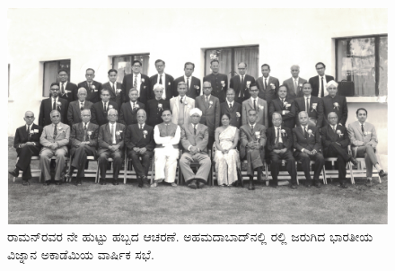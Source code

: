 \begin{figure}
\centering
\includegraphics[scale=0.3]{"images/13.jpg"}
\caption{ ರಾಮನ್‌ರವರ ನೇ ಹುಟ್ಟು ಹಬ್ಬದ ಆಚರಣೆ. ಅಹಮದಾಬಾದ್‌ನಲ್ಲಿ ರಲ್ಲಿ ಜರುಗಿದ ಭಾರತೀಯ ವಿಜ್ನಾನ ಅಕಾಡೆಮಿಯ ವಾರ್ಷಿಕ ಸಭೆ.}\label{chap2-fig03}
\end{figure}

